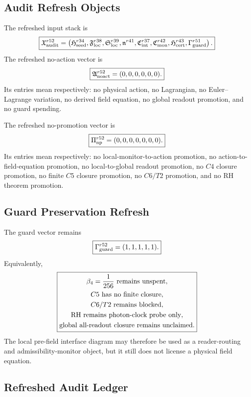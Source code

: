 \subsection{Audit Refresh Objects}
\label{subsec:r52-audit-refresh-objects}

The refreshed input stack is
\[
\boxed{
\mathfrak X_{\rm audit}^{r52}
=
\left(
\mathfrak H_{\rm seed}^{r34},
\mathfrak F_{\rm loc}^{r38},
\mathfrak S_{\rm loc}^{r39},
\mathfrak n^{r41},
\mathfrak C_{\rm int}^{r37},
\mathfrak C_{\rm mon}^{r42},
\mathfrak H_{\rm cert}^{r43},
\Gamma_{\rm guard}^{r51}
\right).
}
\]
The refreshed no-action vector is
\[
\boxed{
\mathfrak A_{\rm noact}^{r52}
=(0,0,0,0,0,0).
}
\]
Its entries mean respectively: no physical action, no Lagrangian, no Euler--Lagrange variation, no derived field equation, no global readout promotion, and no guard spending.

The refreshed no-promotion vector is
\[
\boxed{
\Pi_{\rm np}^{r52}
=(0,0,0,0,0,0,0).
}
\]
Its entries mean respectively: no local-monitor-to-action promotion, no action-to-field-equation promotion, no local-to-global readout promotion, no \(C4\) closure promotion, no finite \(C5\) closure promotion, no \(C6/T2\) promotion, and no RH theorem promotion.

\subsection{Guard Preservation Refresh}
\label{subsec:r52-guard-preservation-refresh}

The guard vector remains
\[
\boxed{
\Gamma_{\rm guard}^{r52}=(1,1,1,1,1).
}
\]
Equivalently,
\[
\boxed{
\begin{gathered}
\beta_4={1\over256}\text{ remains unspent},\\
C5\text{ has no finite closure},\\
C6/T2\text{ remains blocked},\\
\mathrm{RH}\text{ remains photon-clock probe only},\\
\text{global all-readout closure remains unclaimed}.
\end{gathered}
}
\]
The local pre-field interface diagram may therefore be used as a reader-routing and admissibility-monitor object, but it still does not license a physical field equation.

\subsection{Refreshed Audit Ledger}
\label{subsec:r52-refreshed-audit-ledger}

